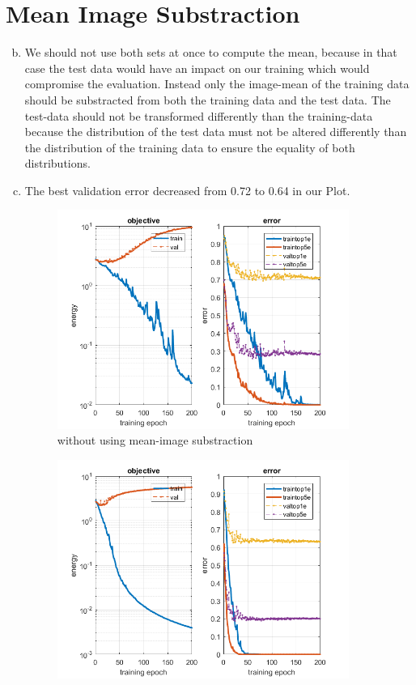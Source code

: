 \documentclass[12pt]{article}
\begin{document}
\newpage
\section{Mean Image Substraction}

\begin{enumerate}[a)]
        \setcounter{enumi}{1}
    \item 
        We should not use both sets at once to compute the mean, because in that case the test data would have an impact on our training which would compromise the evaluation. Instead only the image-mean of the training data should be substracted from both the training data and the test data. The test-data should not be transformed differently than the training-data because the distribution of the test data must not be altered differently than the distribution of the training data to ensure the equality of both  distributions. 
    \item
        The best validation error decreased from 0.72 to 0.64 in our Plot.
        \begin{figure}[H]
            \centering
                \includegraphics[width=0.9\textwidth]{Plots/init_plot_epo_200.png}
                \caption{without using mean-image substraction}
        \end{figure}
        \begin{figure}[H]
            \centering
                \includegraphics[width=0.9\textwidth]{Plots/q2_plot_epo_200.png}

\end{figure}
\end{enumerate}
\end{document}
